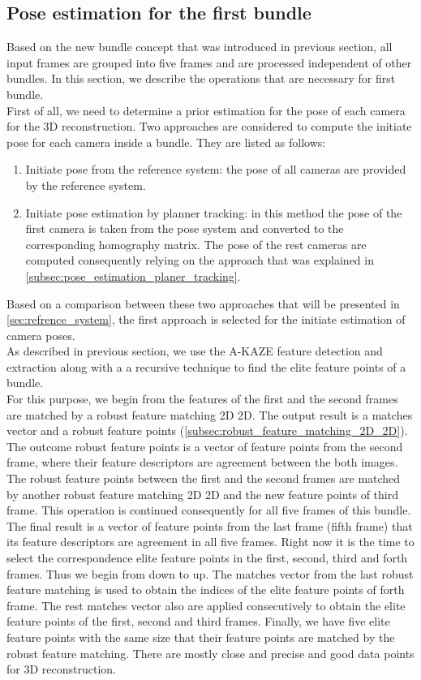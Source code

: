 \subsection{Pose estimation for the first bundle}\label{subsec:pose_first_bundle}
Based on the new bundle concept that was introduced in previous section, all input frames are grouped into five frames and are processed independent of other bundles. In this section, we describe the operations that are necessary for first bundle.\\
First of all, we need to determine a prior estimation for the pose of each camera for the 3D reconstruction. Two approaches are considered to compute the initiate pose for each camera inside a bundle. They are listed as follows:
\begin{enumerate}
\item Initiate pose from the reference system: the pose of all cameras are provided by the reference system.
\item Initiate pose estimation by planner tracking: in this method the pose of the first camera is taken from the pose system and converted to the corresponding homography matrix. The pose of the rest cameras are computed consequently relying on the approach that was explained in \autoref{subsec:pose_estimation_planer_tracking}.
\end{enumerate}
Based on a comparison between these two approaches that will be presented in \autoref{sec:refrence_system}, the first approach is selected for the initiate estimation of camera poses.\\
As described in previous section, we use the A-KAZE feature detection and extraction along with a a recursive technique to find the elite feature points of a bundle. \\
 For this purpose, we begin from the features of the first and the second frames are matched by a robust feature matching 2D 2D. The output result is a matches vector and a robust feature points (\autoref{subsec:robust_feature_matching_2D_2D}). The outcome robust feature points is a vector of feature points from the second frame, where their feature descriptors are agreement between the both images. The robust feature points between the first and the second frames are matched by another robust feature matching 2D 2D and the new feature points of third frame. This operation is continued consequently for all five frames of this bundle. The final result is a vector of feature points from the last frame (fifth frame) that its feature descriptors are agreement in all five frames. Right now it is the time to select the correspondence elite feature points in the first, second, third and forth frames. Thus we begin from down to up. The matches vector from the last robust feature matching is used to obtain the indices of the elite feature points of forth frame. The rest matches vector also are applied consecutively to obtain the elite feature points of the first, second and third frames. Finally, we have five elite feature points with the same size that their feature points are matched by the robust feature matching. There are mostly close and precise and good data points for 3D reconstruction.\\
